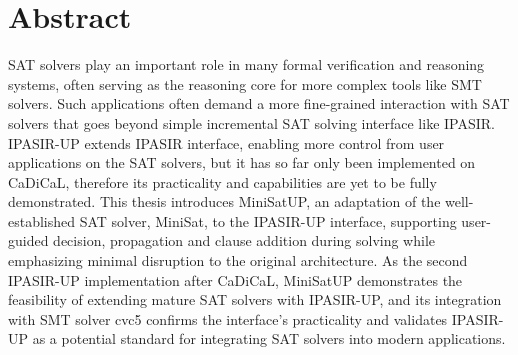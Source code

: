 \chapter*{Abstract}

SAT solvers play an important role in many formal verification and reasoning systems, often serving as the reasoning core for more complex tools like SMT solvers. Such applications often demand a more fine-grained interaction with SAT solvers that goes beyond simple incremental SAT solving interface like IPASIR. IPASIR-UP extends IPASIR interface, enabling more control from user applications on the SAT solvers, but it has so far only been implemented on CaDiCaL, therefore its practicality and capabilities are yet to be fully demonstrated. This thesis introduces MiniSatUP, an adaptation of  the well-established SAT solver, MiniSat, to the IPASIR-UP interface, supporting user-guided decision, propagation and clause addition during solving while emphasizing minimal disruption to the original architecture. As the second IPASIR-UP implementation after CaDiCaL, MiniSatUP demonstrates the feasibility of extending mature SAT solvers with IPASIR-UP, and its integration with SMT solver cvc5 confirms the interface's practicality and validates IPASIR-UP as a potential standard for integrating SAT solvers into modern applications.
